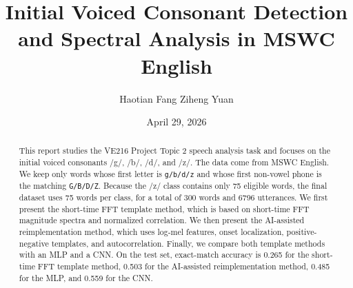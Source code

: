 \documentclass[11pt,a4paper]{article}
\title{Initial Voiced Consonant Detection and Spectral Analysis in MSWC English}
\author{Haotian Fang \quad Ziheng Yuan}
\date{April 29, 2026}
\begin{document}
\maketitle

\begin{abstract}
This report studies the VE216 Project Topic 2 speech analysis task and focuses on the initial voiced consonants /g/, /b/, /d/, and /z/. The data come from MSWC English. We keep only words whose first letter is \texttt{g/b/d/z} and whose first non-vowel phone is the matching \texttt{G/B/D/Z}. Because the /z/ class contains only 75 eligible words, the final dataset uses 75 words per class, for a total of 300 words and 6796 utterances. We first present the short-time FFT template method, which is based on short-time FFT magnitude spectra and normalized correlation. We then present the AI-assisted reimplementation method, which uses log-mel features, onset localization, positive-negative templates, and autocorrelation. Finally, we compare both template methods with an MLP and a CNN. On the test set, exact-match accuracy is 0.265 for the short-time FFT template method, 0.503 for the AI-assisted reimplementation method, 0.485 for the MLP, and 0.559 for the CNN.
\end{abstract}











\appendix

\end{document}
